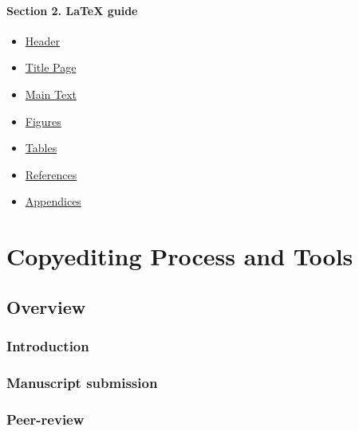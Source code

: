 \documentclass[
  letterpaper,
  DIV=11,
  numbers=noendperiod]{scrreprt}
\providecommand{\tightlist}{%
  \setlength{\itemsep}{0pt}\setlength{\parskip}{0pt}}\usepackage{longtable,booktabs,array}
\begin{document}
\subsection*{Section 2. LaTeX guide}\label{section-2.-latex-guide}

\begin{itemize}
\tightlist
\item
  \href{header.qmd}{Header}
\item
  \href{title-page.qmd}{Title Page}
\item
  \href{main.qmd}{Main Text}
\item
  \href{figures.qmd}{Figures}
\item
  \href{tables.qmd}{Tables}
\item
  \href{references.qmd}{References}
\item
  \href{appendices.qmd}{Appendices}
\end{itemize}

\part{Copyediting Process and Tools}

\chapter*{Overview}\label{overview}


\section*{Introduction}\label{introduction-1}


\section*{Manuscript submission}\label{manuscript-submission}


\section*{Peer-review}\label{peer-review}
\end{document}
